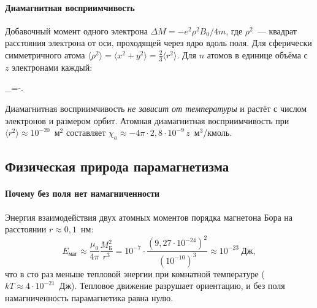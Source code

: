 \paragraph{Диамагнитная восприимчивость}
Добавочный момент одного электрона $\Delta M=-e^2\rho^2B_0/4m$, где
$\rho^2$~— квадрат расстояния электрона от оси, проходящей через ядро
вдоль поля. Для сферически симметричного атома
$\langle\rho^2\rangle=\langle x^2+y^2\rangle=\frac23\langle r^2\rangle$. Для
$n$ атомов в единице объёма с $z$ электронами каждый:
\begin{keyeq}\label{eq:chi-dia}
\chi_=-.
\end{keyeq}
Диамагнитная восприимчивость \emph{не зависит от температуры} и растёт
с числом электронов и размером орбит. Атомная диамагнитная
восприимчивость при $\langle r^2\rangle\approx10^{-20}$~м$^2$ составляет
$\chi_a\approx-4\pi\cdot2{,}8\cdot10^{-9}\,z$~м$^3$/кмоль.

\subsection{Физическая природа парамагнетизма}\label{ssec:paramagn}

\paragraph{Почему без поля нет намагниченности}
Энергия взаимодействия двух атомных моментов порядка магнетона Бора на
расстоянии $r\approx0{,}1$~нм:
\[
E_\text{маг}\approx\frac{\mu_0}{4\pi}\frac{M_\text{Б}^2}{r^3}=
10^{-7}\cdot\frac{(9{,}27\cdot10^{-24})^2}{(10^{-10})^3}\approx10^{-23}~\text{Дж},
\]
что в сто раз меньше тепловой энергии при комнатной температуре
($kT\approx4\cdot10^{-21}$~Дж). Тепловое движение разрушает ориентацию,
и без поля намагниченность парамагнетика равна нулю.

